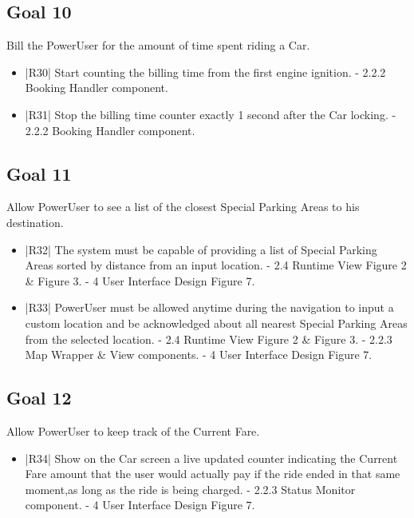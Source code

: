 \subsection {Goal 10} Bill the PowerUser for the amount of time spent riding a Car.
\begin{itemize}
 \item |R30| Start counting the billing time from the first engine ignition.
    \newline - 2.2.2 Booking Handler component.
 \item |R31| Stop the billing time counter exactly 1 second after the Car locking.
    \newline - 2.2.2 Booking Handler component.
\end{itemize}

\subsection {Goal 11} Allow PowerUser to see a list of the closest Special Parking Areas to his destination.
\begin{itemize}
 \item |R32| The system must be capable of providing a list of Special Parking Areas sorted
by distance from an input location.
     \newline - 2.4 Runtime View Figure 2 \& Figure 3.
     \newline - 4 User Interface Design Figure 7.

 \item |R33| PowerUser must be allowed anytime during the navigation to input a custom location and be acknowledged about all nearest Special Parking Areas from the selected location.
    \newline - 2.4 Runtime View Figure 2 \& Figure 3.
    \newline - 2.2.3 Map Wrapper \& View components.
    \newline - 4 User Interface Design Figure 7.
\end{itemize}

\subsection {Goal 12} Allow PowerUser to keep track of the Current Fare.
\begin{itemize}
 \item |R34| Show on the Car screen a live updated counter indicating the Current Fare amount that the user would actually pay if the ride ended in that same moment,as long as the ride is being charged.
    \newline - 2.2.3 Status Monitor component.
    \newline - 4 User Interface Design Figure 7.
\end{itemize}

